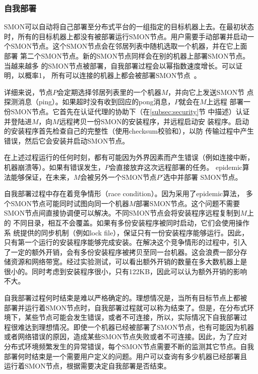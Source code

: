 \subsubsection*{自我部署}


SMON可以自动将自己部署至分布式平台的一组指定的目标机器上去。在最初状态
时，所有的目标机器上都没有被部署运行SMON节点。用户需要手动部署并启动一
个SMON节点。这个SMON节点会在邻居列表中随机选取一个机器，并在它上面部署
第二个SMON节点。新的SMON节点同样会在别的机器上部署SMON节点。当越来越多
的SMON节点被部署，自我部署过程会以幂指数速度增长。可以证明，以概率1，
所有可以连接的机器上都会被部署SMON节点~\cite{Eugster2004}。

详细来说，节点$P$会定期选择邻居列表里的一个机器$M$，并向它上发送SMON节
点探测消息（ping）。如果超时没有收到回应的pong消息，$P$就会在$M$上远程
部署一份SMON节点。它首先在认证代理的协助下（在\ref{subsec:security}节
中描述）认证并登陆进$M$，向$M$远程拷贝一份SMON的安装程序，并远程启动安
装程序。启动的安装程序首先检查自己的完整性（使用checksum校验和），以防
传输过程中产生错误，然后它会安装并启动SMON节点。

在上述过程运行的任何时刻，都有可能因为外界因素而产生错误（例如连接中断，
机器崩溃等）。如果有错误发生，$P$会直接放弃这次远程部署的任务。
epidemic算法能够保证，在未来，$M$会被另外一个SMON节点$P'$选中并部署
SMON节点。

自我部署过程中存在着竞争情形（race condition）。因为采用了epidemic算法，
多个SMON节点可能同时试图向同一个机器$M$部署SMON节点。这个问题不需要
SMON节点间直接协调便可以解决。不同SMON节点会将安装程序远程复制到$M$上的
不同目录，相互不会覆盖。如果有多份安装程序被同时启动，它们会使用操作系
统提供的同步机制（例如lock file），保证只有一份安装程序能够运行。因此，
只有第一个运行的安装程序能够完成安装。在解决这个竞争情形的过程中，引入
了一定的额外开销，会有多份安装程序被拷贝至同一台机器。这会浪费一部分存
储资源和网络带宽。经过实验测试，可以看出额外开销的数量在多大数机器上是
很小的。同时考虑到安装程序很小，只有122KB，因此可以认为额外开销的影响
不大。

自我部署过程何时结束是难以严格确定的。理想情况是，当所有目标节点上都被
部署并运行着SMON节点时，自我部署过程就可以称为结束了。但是，在分布式环
境下，某些节点可能会发生错误，或者不可连接，所以，实际情况下自我部署过
程很难达到理想情况。即使一个机器已经被部署了SMON节点，也有可能因为机器
或者网络错误的原因，造成某些SMON节点失败或者不可连接。因此，为了应对
分布式环境频繁发生的异常错误，每个SMON节点需要不断的监测其它节点。自我
部署何时结束是一个需要用户定义的问题。用户可以查询有多少机器已经部署且
运行着SMON节点，根据需要决定自我部署是否结束。

